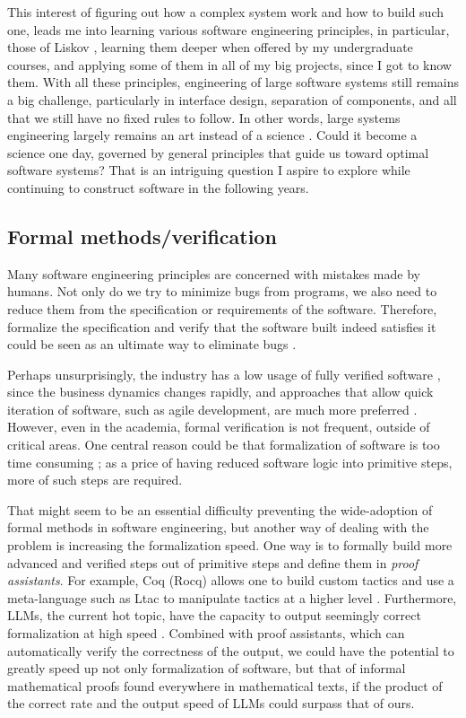 \documentclass{article}
\begin{document}
This interest of figuring out how a complex system work and how to build such
one, leads me into learning various software engineering principles, in
particular, those of Liskov \cite{liskov.adt, liskov.subtype}, learning them
deeper when offered by my undergraduate courses, and applying some of them in
all of my big projects, since I got to know them. With all these principles,
engineering of large software systems still remains a big challenge,
particularly in interface design, separation of components, and all that we
still have no fixed rules to follow. In other words, large systems engineering
largely remains an art instead of a science \cite{no.silver.bullet,
prospect.eng.discipline.software}. Could it become a science one day, governed
by general principles that guide us toward optimal software systems? That is an
intriguing question I aspire to explore while continuing to construct software
in the following years.

\subsection{Formal methods/verification}
Many software engineering principles are concerned with mistakes made by
humans. Not only do we try to minimize bugs from programs, we also
need to reduce them from the specification or requirements of the software.
Therefore, formalize the specification and verify that the software built
indeed satisfies it could be seen as an ultimate way to eliminate bugs
\cite{hoare.axiomatic.prog}. 

Perhaps unsurprisingly, the industry has a low usage of fully verified software
\cite{formal.methods.underuse}, since the business dynamics changes rapidly,
and approaches that allow quick iteration of software, such as agile
development, are much more preferred \cite{agile.se}. However, even in the
academia, formal verification is not frequent, outside of critical areas. One
central reason could be that formalization of software is too time consuming
\cite{formal.methods.underuse}; as a price of having reduced software logic
into primitive steps, more of such steps are required.

That might seem to be an essential difficulty preventing the wide-adoption of
formal methods in software engineering, but another way of dealing with the
problem is increasing the formalization speed. One way is to formally build
more advanced and verified steps out of primitive steps and define them in
\emph{proof assistants}. For example, Coq (Rocq) allows one to build custom
tactics and use a meta-language such as Ltac to manipulate tactics at a higher
level \cite{coq.manual}. Furthermore, LLMs, the current hot topic, have the
capacity to output seemingly correct formalization at high speed
\cite{llm.gen.proof}.  Combined with proof assistants, which can automatically
verify the correctness of the output, we could have the potential to greatly
speed up not only formalization of software, but that of informal mathematical
proofs found everywhere in mathematical texts, if the product of the correct
rate and the output speed of LLMs could surpass that of ours.
\end{document}
